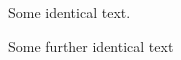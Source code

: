 \documentclass{article}
\begin{document}
Some identical text.

Some further identical text
\end{document}
